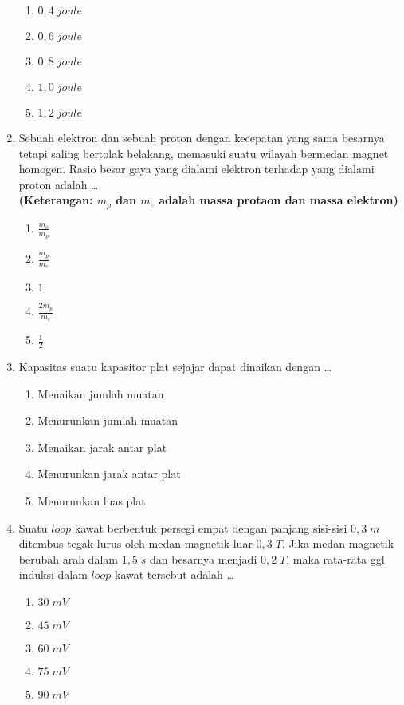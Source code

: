 \documentclass[A4,12PT, english, twocolumn]{journal}
\begin{document}
\begin{enumerate}
\begin{center}
\end{center}
    \begin{enumerate}
        \item $0,4 \; joule$
        \item $0,6 \; joule$
        \item $0,8 \; joule$
        \item $1,0 \; joule$
        \item $1,2 \; joule$
    \end{enumerate}

\item Sebuah elektron dan sebuah proton dengan kecepatan yang sama besarnya tetapi saling bertolak belakang, memasuki suatu wilayah bermedan magnet homogen. Rasio besar gaya yang dialami elektron terhadap yang dialami proton adalah \dots \\
\textbf{(Keterangan: $m_p$ dan $m_e$ adalah massa protaon dan massa elektron)}
    \begin{enumerate}
        \item $\frac{m_e}{m_p}$
        \item $\frac{m_p}{m_e}$
        \item $1$
        \item $\frac{2m_p}{m_e}$
        \item $\frac{1}{2}$
    \end{enumerate}

\item Kapasitas suatu kapasitor plat sejajar dapat dinaikan dengan \dots
    \begin{enumerate}
        \item Menaikan jumlah muatan
        \item Menurunkan jumlah muatan
        \item Menaikan jarak antar plat
        \item Menurunkan jarak antar plat
        \item Menurunkan luas plat
    \end{enumerate}
    
\item Suatu $loop$ kawat berbentuk persegi empat dengan panjang sisi-sisi $0,3 \; m$ ditembus tegak lurus oleh medan magnetik luar $0,3 \; T$. Jika medan magnetik berubah arah dalam $1,5 \; s$ dan besarnya menjadi $0,2 \; T$, maka rata-rata ggl induksi dalam $loop$ kawat tersebut adalah \dots
    \begin{enumerate}
        \item $30 \; mV$
        \item $45 \; mV$
        \item $60 \; mV$
        \item $75 \; mV$
        \item $90 \; mV$
    \end{enumerate}
    

\end{enumerate}
\end{document}
